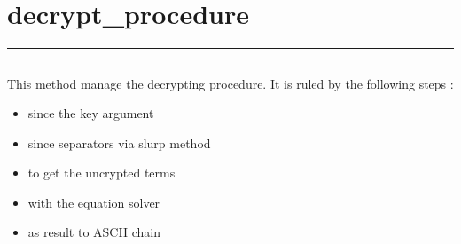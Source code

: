 \documentclass[letterpaper,10pt,english]{sphinxmanual}
\begin{document}
\newpage
\section{decrypt\_procedure}
\label{\detokenize{decrypt_procedurev3:decrypt-procedure}}\label{\detokenize{decrypt_procedurev3::doc}}
\begin{sphinxVerbatim}[commandchars=\\\{\}]
 
\end{sphinxVerbatim}


\bigskip\hrule\bigskip



\subsection{}
\label{\detokenize{decrypt_procedurev3:algorithm}}
\sphinxAtStartPar
This method manage the decrypting procedure.
It is ruled by the following steps :
\begin{itemize}
\item {} 
\sphinxAtStartPar
{} since the key argument

\item {} 
\sphinxAtStartPar
{} since separators via slurp method

\item {} 
\sphinxAtStartPar
{} to get the uncrypted terms

\item {} 
\sphinxAtStartPar
{} with the equation solver

\item {} 
\sphinxAtStartPar
{} as result to ASCII chain

\end{itemize}
\end{document}
